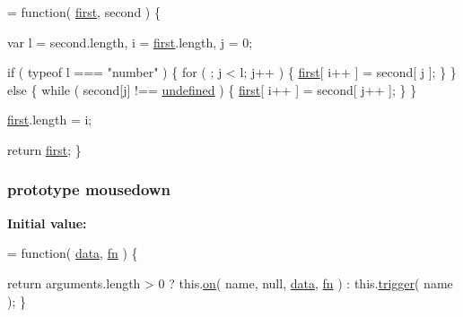 \begin{DoxyCode}
= \textcolor{keyword}{function}( \hyperlink{jquery-1_810_82-vsdoc_8js_a436adcac6bdff190fbce85670078e885}{first}, second ) \{


        var l = second.length,
            i = \hyperlink{jquery-1_810_82-vsdoc_8js_a436adcac6bdff190fbce85670078e885}{first}.length,
            j = 0;

        \textcolor{keywordflow}{if} ( typeof l === \textcolor{stringliteral}{"number"} ) \{
            \textcolor{keywordflow}{for} ( ; j < l; j++ ) \{
                \hyperlink{jquery-1_810_82-vsdoc_8js_a436adcac6bdff190fbce85670078e885}{first}[ i++ ] = second[ j ];
            \}
        \} \textcolor{keywordflow}{else} \{
            \textcolor{keywordflow}{while} ( second[j] !== \hyperlink{jquery-1_810_82-vsdoc_8js_a08113a236cc18d2a9d5ce27e638012be}{undefined} ) \{
                \hyperlink{jquery-1_810_82-vsdoc_8js_a436adcac6bdff190fbce85670078e885}{first}[ i++ ] = second[ j++ ];
            \}
        \}

        \hyperlink{jquery-1_810_82-vsdoc_8js_a436adcac6bdff190fbce85670078e885}{first}.length = i;

        \textcolor{keywordflow}{return} \hyperlink{jquery-1_810_82-vsdoc_8js_a436adcac6bdff190fbce85670078e885}{first};
    \}
\end{DoxyCode}
\hypertarget{jquery-1_810_82-vsdoc_8js_ad995651a26de4e6b051bbbeff5591c79}{
\subsubsection[{mousedown}]{ {\bf prototype} mousedown}}\label{jquery-1_810_82-vsdoc_8js_ad995651a26de4e6b051bbbeff5591c79}
{\bfseries Initial value\-:}
\begin{DoxyCode}
= \textcolor{keyword}{function}( \hyperlink{jquery-1_810_82-vsdoc_8js_a609407b3456fdc3c5671a9fc4a226ff7}{data}, \hyperlink{jquery-1_810_82-vsdoc_8js_acef6bdaf6b9b20fdcca1ea86f0902c3b}{fn} ) \{


        \textcolor{keywordflow}{return} arguments.length > 0 ?
            this.\hyperlink{jquery-1_810_82-vsdoc_8js_ae453b412b883f60220d73468ef6c6dbc}{on}( name, null, \hyperlink{jquery-1_810_82-vsdoc_8js_a609407b3456fdc3c5671a9fc4a226ff7}{data}, \hyperlink{jquery-1_810_82-vsdoc_8js_acef6bdaf6b9b20fdcca1ea86f0902c3b}{fn} ) :
            this.\hyperlink{jquery-1_810_82-vsdoc_8js_a2388c4114d5e3e4eab020f973641519c}{trigger}( name );
    \}
\end{DoxyCode}
